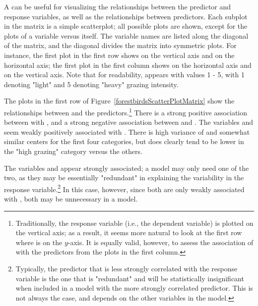 A  can be useful for visualizing the relationships between the predictor and response variables, as well as the relationships between predictors. Each subplot in the matrix is a simple scatterplot; all possible plots are shown, except for the plots of a variable versus itself. The variable names are listed along the diagonal of the matrix, and the diagonal divides the matrix into symmetric plots. For instance, the first plot in the first row shows  on the vertical axis and  on the horizontal axis; the first plot in the first column shows  on the horizontal axis and  on the vertical axis. Note that for readability,  appears with values 1 - 5, with 1 denoting "light" and 5 denoting "heavy" grazing intensity.
   
The plots in the first row of Figure~\ref{forestbirdsScatterPlotMatrix} show the relationships between  and the predictors.\footnote{Traditionally, the response variable (i.e., the dependent variable) is plotted on the vertical axis; as a result, it seems more natural to look at the first row where  is on the $y$-axis. It is equally valid, however, to assess the association of  with the predictors from the plots in the first column.} There is a strong positive association between  with , and a strong negative association between  and . The variables  and  seem weakly positively associated with . There is high variance of  and somewhat similar centers for the first four categories, but  does clearly tend to be lower in the "high grazing" category versus the others.

The variables  and  appear strongly associated; a model may only need one of the two, as they may be essentially "redundant" in explaining the variability in the response variable.\footnote{Typically, the predictor that is less strongly correlated with the response variable is the one that is "redundant" and will be statistically insignificant when included in a model with the more strongly correlated predictor. This is not always the case, and depends on the other variables in the model.} In this case, however, since both are only weakly associated with , both may be unnecessary in a model.

    
